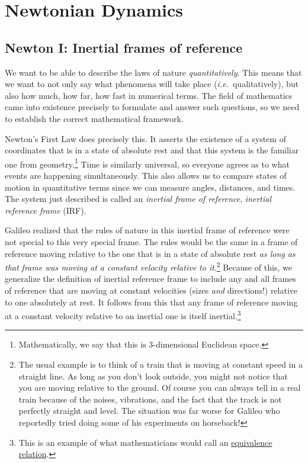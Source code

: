 \newpage
\section{Newtonian Dynamics}
\subsection{Newton I: Inertial frames of reference}
We want to be able to describe the laws of nature {\it quantitatively}. 
This means that we want to not only say what phenomena will take place ({\it i.e.}\ qualitatively), but also how much, how far, how fast in numerical terms.
The field of mathematics came into existence precisely to formulate and answer such questions, so we need to establish the correct mathematical framework. 

Newton's First Law does precisely this. It asserts the existence of a system of coordinates that is in a state of absolute rest and that this system is the familiar one from geometry.\footnote{Mathematically, we say that this is 3-dimensional Euclidean space.} 
Time is similarly universal, so everyone agrees as to what events are happening simultaneously. 
This also allows us to compare states of motion in quantitative terms since we can measure angles, distances, and times. 
The system just described is called an {\em inertial frame of reference}, {\em inertial reference frame} (IRF). 

Galileo realized that the rules of nature 
in this inertial frame of reference were not special to this very special frame. 
The rules would be the same in a frame of reference moving relative to the one that is in a state of absolute rest {\em as long as that frame was moving at a constant velocity relative to it}.\footnote{The usual example is to think of a train that is moving at constant speed in a straight line. As long as you don't look outside, you might not notice that you are moving relative to the ground. Of course you can always tell in a real train because of the noises, vibrations, and the fact that the track is not perfectly straight and level. The situation was far worse for Galileo who reportedly tried doing some of his experiments on horseback!}
Because of this, we generalize the definition of inertial reference frame to include any and all frames of reference that are moving at constant velocities (sizes {\em and} directions!) relative to one absolutely at rest. 
It follows from this that any frame of reference moving at a constant velocity relative to an inertial one is itself inertial.\footnote{This is an example of what mathematicians would call an \href{https://en.wikipedia.org/wiki/Equivalence_relation}{equivalence relation}.}

